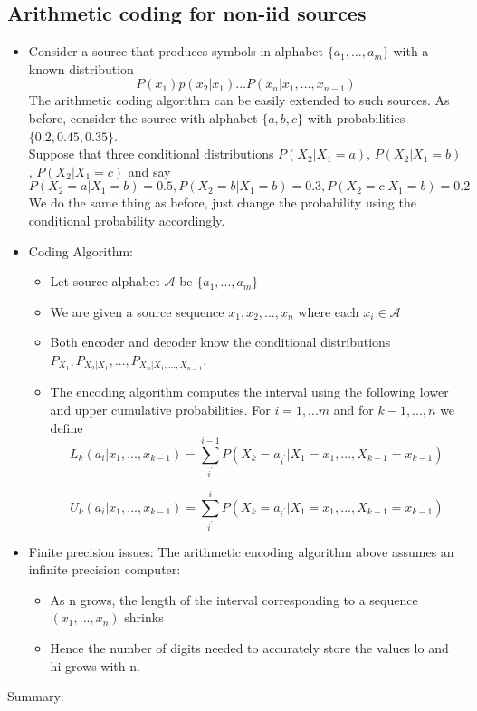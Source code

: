 \documentclass[24pt]{article}
\begin{document}
\subsection{Arithmetic coding for non-iid sources}
\begin{itemize}
\item Consider a source that produces symbols in alphabet $\{ a_1,...,a_m\}$ with a known distribution 
\[
P(x_1)p(x_2|x_1)...P(x_n|x_1,...,x_{n-1})
\]
The arithmetic coding algorithm can be easily extended to such sources. As before, consider the source with alphabet $\{a,b,c\}$ with probabilities $\{0.2,0.45,0.35\}$. \\
Suppose that three conditional distributions $P(X_2|X_1=a)$, $P(X_2|X_1=b)$, $P(X_2|X_1=c)$ and say
\[
P(X_2=a|X_1=b)=0.5 , P(X_2=b|X_1=b)=0.3, P(X_2=c|X_1=b)=0.2
\]
We do the same thing as before, just change the probability using the conditional probability accordingly.
\item Coding Algorithm:
\begin{itemize}
\item Let source alphabet $\mathcal{A}$ be $\{ a_1,...,a_m\}$
\item We are given a source sequence $x_1,x_2,...,x_n$ where each $x_i \in \mathcal{A}$
\item Both encoder and decoder know the conditional distributions $P_{X_1}, P_{X_2|X_1},...,P_{X_n|X_1,...,X_{n-1}}.$
\item The encoding algorithm computes the interval using the following lower and upper cumulative probabilities.
For $i=1,...m$ and for $k-1,...,n$ we define 
\[
L_k(a_i|x_1,...,x_{k-1}) = \sum_{i^{\prime}}^{i-1}  P(X_k=a_{i^{\prime}} | X_1=x_1,...,X_{k-1}=x_{k-1}) 
\]

\[
U_k(a_i|x_1,...,x_{k-1}) = \sum_{i^{\prime}}^{i}  P(X_k=a_{i^{\prime}} | X_1=x_1,...,X_{k-1}=x_{k-1})
\]
\end{itemize}
\item Finite precision issues:
The arithmetic encoding algorithm above assumes an infinite precision computer:
\begin{itemize}
\item As n grows, the length of the interval corresponding to a sequence $(x_1,...,x_n)$ shrinks
\item Hence the number of digits needed to accurately store the values lo and hi grows with n.
\end{itemize}
\end{itemize}
Summary:
\end{document}
